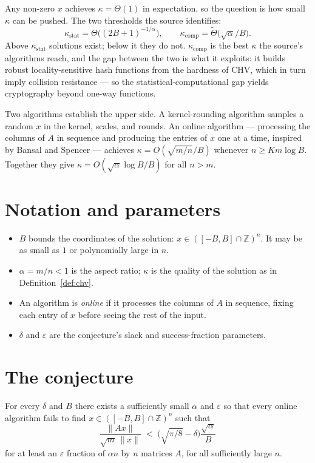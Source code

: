 \documentclass{aicr-conjecture}
\newcommand{\eps}{\varepsilon}
\newcommand{\Z}{\mathbb{Z}}
\newcommand{\CHV}{\mathrm{CHV}}
\begin{document}
Any non-zero $x$ achieves $\kappa = \Theta(1)$ in expectation, so the
question is how small $\kappa$ can be pushed. The two thresholds the
source identifies:
\[
  \kappa_{\mathrm{stat}} = \Theta\bigl((2B+1)^{-1/\alpha}\bigr),
  \qquad
  \kappa_{\mathrm{comp}} = \tilde{\Theta}\bigl(\sqrt{\alpha}/B\bigr).
\]
Above $\kappa_{\mathrm{stat}}$ solutions exist; below it they do not.
$\kappa_{\mathrm{comp}}$ is the best $\kappa$ the source's algorithms
reach, and the gap between the two is what it exploits: it builds robust
locality-sensitive hash functions from the hardness of $\CHV$, which in
turn imply collision resistance --- so the statistical-computational gap
yields cryptography beyond one-way functions.

Two algorithms establish the upper side. A kernel-rounding algorithm
samples a random $x$ in the kernel, scales, and rounds. An online
algorithm --- processing the columns of $A$ in sequence and producing the
entries of $x$ one at a time, inspired by Bansal and Spencer --- achieves
$\kappa = O(\sqrt{m/n}/B)$ whenever $n \ge Km\log B$. Together they give
$\kappa = O(\sqrt{\alpha}\log B/B)$ for all $n > m$.

\section{Notation and parameters}\label{sec:notation}

\begin{itemize}[nosep]
  \item $B$ bounds the coordinates of the solution: $x \in ([-B,B] \cap
    \Z)^{n}$. It may be as small as $1$ or polynomially large in $n$.
  \item $\alpha = m/n < 1$ is the aspect ratio; $\kappa$ is the quality
    of the solution as in Definition~\ref{def:chv}.
  \item An algorithm is \emph{online} if it processes the columns of $A$
    in sequence, fixing each entry of $x$ before seeing the rest of the
    input.
  \item $\delta$ and $\eps$ are the conjecture's slack and
    success-fraction parameters.
\end{itemize}

\section{The conjecture}\label{sec:conjectures}

\begin{conjecture}\label{conj:main}
For every $\delta$ and $B$ there exists a sufficiently small $\alpha$ and
$\eps$ so that every online algorithm fails to find $x \in ([-B,B] \cap
\Z)^{n}$ such that
\[
  \frac{\|Ax\|}{\sqrt{m}\,\|x\|} \;<\; \bigl(\sqrt{\pi/8} -
  \delta\bigr)\frac{\sqrt{\alpha}}{B}
\]
for at least an $\eps$ fraction of $\alpha n$ by $n$ matrices $A$, for
all sufficiently large $n$.
\end{conjecture}
\end{document}
